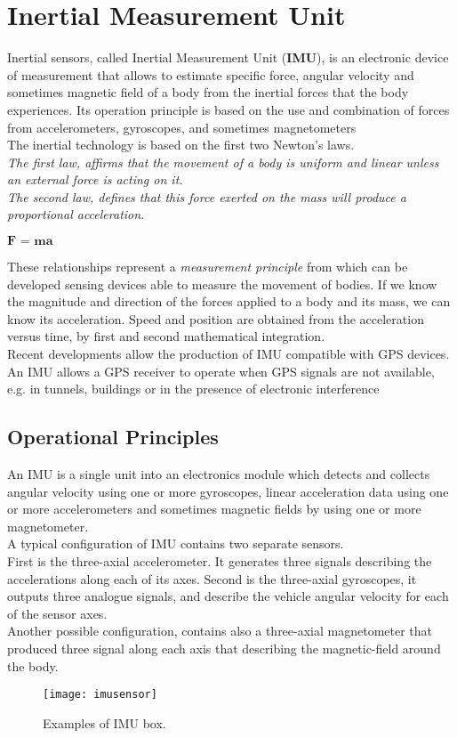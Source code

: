 \documentclass[tesi]{subfiles}
\begin{document}
\chapter{Inertial Measurement Unit}
\label{ch:Inertial Measurement Unit}
Inertial sensors, called Inertial Measurement Unit (\textbf{IMU}), is an electronic device of measurement that allows to estimate specific force, angular velocity and sometimes magnetic field of a body from the inertial forces that the body experiences. Its operation principle is based on the use and combination of forces from accelerometers, gyroscopes, and sometimes magnetometers\\
\noindent The inertial technology is based on the first two Newton’s laws. \\
\textit{The first law, affirms that the movement of a body is uniform and linear unless an external force is acting on it.} \\
\textit{The second law, defines that this force exerted on the mass will produce a proportional acceleration.
} 
\begin{center}
$ \textbf{F = ma} $
\end{center}

\noindent These relationships represent a \textit{measurement principle} from which can be developed sensing devices  able to measure the movement of bodies.
If we know the magnitude and direction of the forces applied to a body and its mass, we can know its acceleration. Speed and position are obtained from the acceleration versus time, by first and second mathematical integration.\\
Recent developments allow the production of IMU compatible with GPS devices. An IMU allows a GPS receiver to operate when GPS signals are not available, e.g. in tunnels, buildings or in the presence of electronic interference\cite{gpssystem} 
\newpage
\section{Operational Principles}\label{sc:Operational Principles}
An IMU is a single unit into an electronics module which detects and collects angular velocity using one or more gyroscopes, linear acceleration data using one or more accelerometers and sometimes magnetic fields by using one or more magnetometer.\\
A typical configuration of IMU contains two separate sensors. \\First is the three-axial accelerometer. It 
generates three signals describing the accelerations along each of its axes. Second is the three-axial gyroscopes, it  outputs three analogue signals, and describe the vehicle angular velocity for each of the sensor axes.\\ Another possible configuration, contains also a three-axial magnetometer that produced three signal along each axis that describing the magnetic-field around the body.
\begin{center}
\begin{figure}[h]
\centering
\texttt{[image: imusensor]}
\caption{Examples of IMU box.}
\label{fig:IMU box}
\end{figure}
\end{center}
\clearpage
\end{document}
